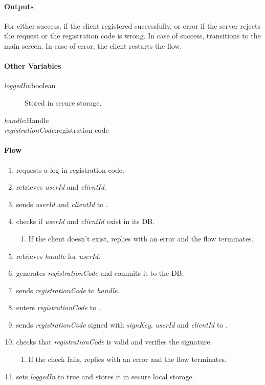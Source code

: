 \documentclass[a4paper,10pt,draft]{article}
\newcommand{\handle}{\emph{handle}}
\newcommand{\registrationCode}{\emph{registrationCode}}
\newcommand{\signKey}{\emph{signKey}}
\newcommand{\userId}{\emph{userId}}
\newcommand{\clientId}{\emph{clientId}}
\newcommand{\loggedIn}{\emph{loggedIn}}
\begin{document}
\paragraph{Outputs}
For \Client{} either success, if the client registered successfully, or error if the server rejects the request or the registration code is wrong. In case of success, \Client{} 
transitions to the main screen. In case of error, the client restarts the flow.

\paragraph{Other Variables}
\SpecialItem
\begin{description}
 \item[\loggedIn{}:boolean] Stored in secure storage.
 \item[\handle{}:Handle]
 \item[\registrationCode{}:registration code]
\end{description}

\paragraph{Flow}

\begin{enumerate}
 \item \User{} requests a log in registration code.
 \item \Client{} retrieves \userId{} and \clientId{}.
 \item \Client{} sends \userId{} and \clientId{} to \Server{}.
 \item \Server{} checks if \userId{} and \clientId{} exist in its DB.
 \begin{enumerate}
  \item If the client doesn't exist, \Server{} replies with an error and the flow terminates.
 \end{enumerate}
 \item \Server{} retrieves \handle{} for \userId{}.
 \item \Server{} generates \registrationCode{} and commits it to the DB.
 \item \Server{} sends \registrationCode{} to \handle{}.
 \item \User{} enters \registrationCode{} to \Client{}.
 \item\label{log_out_client_flow:one} \Client{} sends \registrationCode{} signed with \signKey{}, \userId{} and \clientId{} to \Server{}.
 \item \Server{} checks that \registrationCode{} is valid and verifies the signature.
 \begin{enumerate}
  \item If the check fails, \Server{} replies with an error and the flow terminates.
 \end{enumerate}
 \item \Client{} sets \loggedIn{} to true and stores it in secure local storage.
\end{enumerate}
\end{document}
